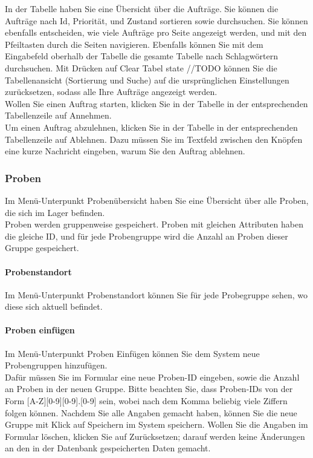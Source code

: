 \documentclass[enabledeprecatedfontcommands,fontsize=12pt,paper=a4,twoside]{scrartcl}
\begin{document}
In der Tabelle haben Sie eine Übersicht über die Aufträge. Sie können die Aufträge nach Id, Priorität, und Zustand sortieren sowie durchsuchen. Sie können ebenfalls entscheiden, wie viele Aufträge pro Seite angezeigt werden, und mit den Pfeiltasten durch die Seiten navigieren. Ebenfalls können Sie mit dem Eingabefeld oberhalb der Tabelle die gesamte Tabelle nach Schlagwörtern durchsuchen. Mit Drücken auf Clear Tabel state //TODO können Sie die Tabellenansicht (Sortierung und Suche) auf die ursprünglichen Einstellungen zurücksetzen, sodass alle Ihre Aufträge angezeigt werden. \\

Wollen Sie einen Auftrag starten, klicken Sie in der Tabelle in der entsprechenden Tabellenzeile auf Annehmen. \\

Um einen Auftrag abzulehnen, klicken Sie in der Tabelle in der entsprechenden Tabellenzeile auf Ablehnen. Dazu müssen Sie im Textfeld zwischen den Knöpfen eine kurze Nachricht eingeben, warum Sie den Auftrag ablehnen. \\

\subsubsection{Proben}
Im Menü-Unterpunkt Probenübersicht haben Sie eine Übersicht über alle Proben, die sich im Lager befinden. \\

Proben werden gruppenweise gespeichert. Proben mit gleichen Attributen haben die gleiche ID, und für jede Probengruppe wird die Anzahl an Proben dieser Gruppe gespeichert. \\

\paragraph{Probenstandort}
Im Menü-Unterpunkt Probenstandort können Sie für jede Probegruppe sehen, wo diese sich aktuell befindet. \\

\paragraph{Proben einfügen}
Im Menü-Unterpunkt Proben Einfügen können Sie dem System neue Probengruppen hinzufügen. \\

Dafür müssen Sie im Formular eine neue Proben-ID eingeben, sowie die Anzahl an Proben in der neuen Gruppe. Bitte beachten Sie, dass Proben-IDs von der Form [A-Z][0-9][0-9].[0-9] sein, wobei nach dem Komma beliebig viele Ziffern folgen können. Nachdem Sie alle Angaben gemacht haben, können Sie die neue Gruppe mit Klick auf Speichern im System speichern. Wollen Sie die Angaben im Formular löschen, klicken Sie auf Zurücksetzen; darauf werden keine Änderungen an den in der Datenbank gespeicherten Daten gemacht. \\
\end{document}
